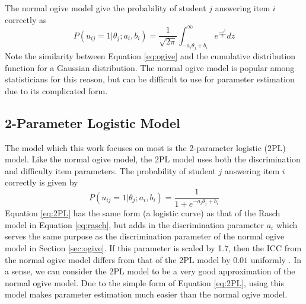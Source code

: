 The normal ogive model give the probability of student $j$ answering item $i$ correctly as
\begin{equation}
  P(u_{ij} = 1 | \theta_j; a_i, b_i) = \frac{1}{\sqrt{2\pi}} \int_{-a_i \theta_j + b_i}^\infty e^{\frac{-z^{2}}{2}}dz
  \label{eq:ogive}
\end{equation}
Note the similarity between Equation \ref{eq:ogive} and the cumulative distribution function for a Gaussian distribution. The normal ogive model is popular among statisticians for this reason, but can be difficult to use for parameter estimation due to its complicated form.

\subsection{2-Parameter Logistic Model}
The model which this work focuses on most is the 2-parameter logistic (2PL) model. Like the normal ogive model, the 2PL model uses both the discrimination and difficulty item parameters. The probability of student $j$ answering item $i$ correctly is given by
\begin{equation}
  P(u_{ij} = 1 | \theta_j; a_i, b_i) = \frac{1}{1 + e^{-a_i \theta_j + b_i}}
  \label{eq:2PL}
\end{equation}
Equation \ref{eq:2PL} has the same form (a logistic curve) as that of the Rasch model in Equation \ref{eq:rasch}, but adds in the discrimination parameter $a_i$ which serves the same purpose as the discrimination parameter of the normal ogive model in Section \ref{sec:ogive}. If this parameter is scaled by 1.7, then the ICC from the normal ogive model differs from that of the 2PL model by $0.01$ uniformly \cite{baker_kim2004}. In a sense, we can consider the 2PL model to be a very good approximation of the normal ogive model. Due to the simple form of Equation \ref{eq:2PL}, using this model makes parameter estimation much easier than the normal ogive model.


